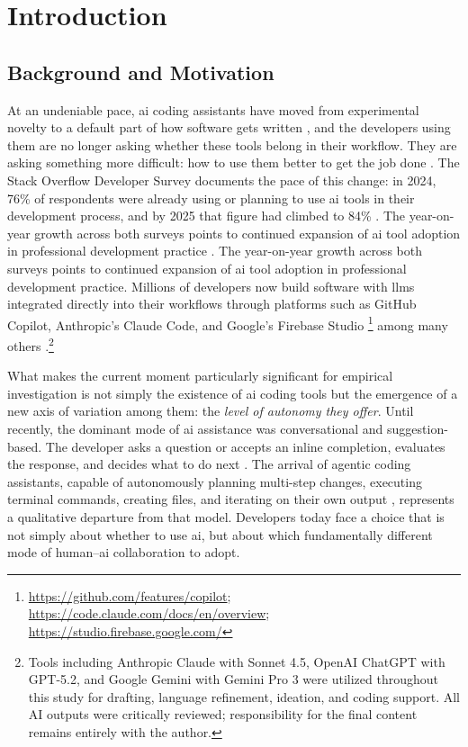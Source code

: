 \chapter{Introduction}
\label{chap:introduction}

\section{Background and Motivation}
\label{sec:intro-motivation}

At an undeniable pace, \gls{ai} coding assistants have moved from experimental novelty to a default part of how software gets written \parencite{he2025cursorDID}, and the developers using them are no longer asking whether these tools belong in their workflow. They are asking something more difficult: how to use them better to get the job done \parencite{barke2023groundedcopilot, vaithilingam2022expectation}. The Stack Overflow Developer Survey documents the pace of this change: in 2024, 76\% of respondents were already using or planning to use \gls{ai} tools in their development process, and by 2025 that figure had climbed to 84\% \parencite{stackOverflow2024survey, stackOverflow2025survey}. The year-on-year growth across both surveys points to continued expansion of \gls{ai} tool adoption in professional development practice \parencite{stackOverflow2024survey, stackOverflow2025survey}. The year-on-year growth across both surveys points to continued expansion of \gls{ai} tool adoption in professional development practice. Millions of developers now build software with \glspl{llm} integrated directly into their workflows through platforms such as GitHub Copilot, Anthropic's Claude Code, and Google's Firebase Studio%
\footnote{\url{https://github.com/features/copilot}; \url{https://code.claude.com/docs/en/overview}; \url{https://studio.firebase.google.com/}} among many others \parencite[pp.~54--55]{ziegler2024measuring}.\footnote{%
  Tools including Anthropic Claude with Sonnet 4.5, OpenAI ChatGPT with GPT-5.2, and Google Gemini with Gemini Pro 3 were utilized throughout this study for drafting, language refinement, ideation, and coding support. All AI outputs were critically reviewed; responsibility for the final content remains entirely with the author.%
}

What makes the current moment particularly significant for empirical investigation is not simply the existence of \gls{ai} coding tools but the emergence of a new axis of variation among them: the \emph{level of autonomy they offer}. Until recently, the dominant mode of \gls{ai} assistance was conversational and suggestion-based. The developer asks a question or accepts an inline completion, evaluates the response, and decides what to do next \parencite{barke2023groundedcopilot}. The arrival of agentic coding assistants, capable of autonomously planning multi-step changes, executing terminal commands, creating files, and iterating on their own output \parencite{vscodeCopilotAgentMode}, represents a qualitative departure from that model. Developers today face a choice that is not simply about whether to use \gls{ai}, but about which fundamentally different mode of human--\gls{ai} collaboration to adopt.

